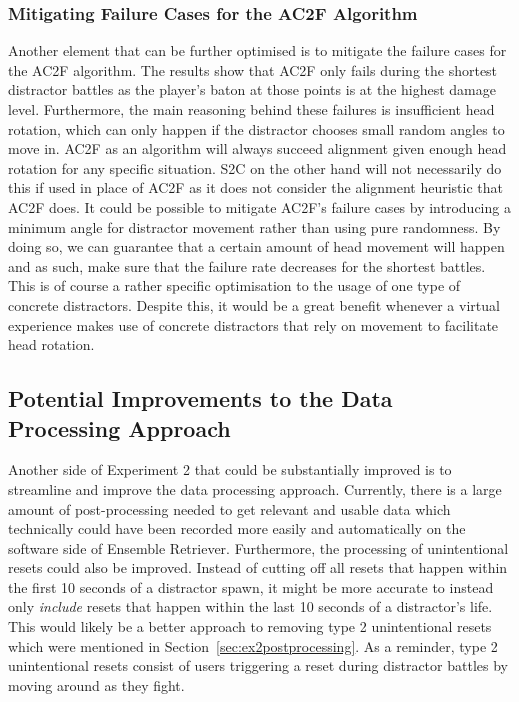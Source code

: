\subsubsection{Mitigating Failure Cases for the AC2F Algorithm}
Another element that can be further optimised is to mitigate the failure cases for the AC2F algorithm. The results show that AC2F only fails during the shortest distractor battles as the player's baton at those points is at the highest damage level. Furthermore, the main reasoning behind these failures is insufficient head rotation, which can only happen if the distractor chooses small random angles to move in. AC2F as an algorithm will always succeed alignment given enough head rotation for any specific situation. S2C on the other hand will not necessarily do this if used in place of AC2F as it does not consider the alignment heuristic that AC2F does. It could be possible to mitigate AC2F's failure cases by introducing a minimum angle for distractor movement rather than using pure randomness. By doing so, we can guarantee that a certain amount of head movement will happen and as such, make sure that the failure rate decreases for the shortest battles. This is of course a rather specific optimisation to the usage of one type of concrete distractors. Despite this, it would be a great benefit whenever a virtual experience makes use of concrete distractors that rely on movement to facilitate head rotation. 

\subsection{Potential Improvements to the Data Processing Approach}\label{sec:improvingDataRecording}
Another side of Experiment 2 that could be substantially improved is to streamline and improve the data processing approach. Currently, there is a large amount of post-processing needed to get relevant and usable data which technically could have been recorded more easily and automatically on the software side of Ensemble Retriever. Furthermore, the processing of unintentional resets could also be improved. Instead of cutting off all resets that happen within the first 10 seconds of a distractor spawn, it might be more accurate to instead only \emph{include} resets that happen within the last 10 seconds of a distractor's life. This would likely be a better approach to removing type 2 unintentional resets which were mentioned in Section~\ref{sec:ex2postprocessing}. As a reminder, type 2 unintentional resets consist of users triggering a reset during distractor battles by moving around as they fight.

